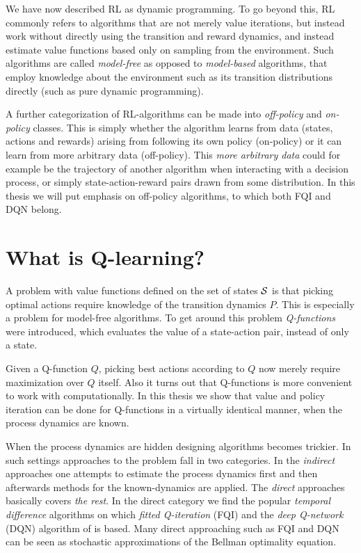 We have now described RL as dynamic programming.
To go beyond this, RL commonly refers to algorithms that
are not merely value iterations, but instead work without
directly using the transition and reward dynamics,
and instead estimate value functions based only on sampling from the
environment.
Such algorithms are called \emph{model-free} as opposed to
\emph{model-based} algorithms, that employ knowledge about the
environment such as its transition distributions directly
(such as pure dynamic programming).

A further categorization of RL-algorithms can be made into
\emph{off-policy} and \emph{on-policy} classes.
This is simply whether the algorithm learns from data
(states, actions and rewards) arising from 
following its own policy (on-policy) or it can learn from more
arbitrary data (off-policy).
This \emph{more arbitrary data} could for example be
the trajectory of another algorithm when interacting with a decision process,
or simply state-action-reward pairs drawn from some distribution.
In this thesis we will put emphasis on off-policy algorithms,
to which both FQI and DQN belong.

\section{What is Q-learning?}

A problem with value functions defined on the set of states $\mathcal{S}$ is that
picking optimal actions require knowledge of the transition dynamics $P$.
This is especially a problem for model-free algorithms.
To get around this problem \emph{Q-functions} were introduced, which evaluates
the value of a state-action pair, instead of only a state.

Given a Q-function $Q$, picking best actions according to $Q$ now
merely require maximization over $Q$ itself.
Also it turns out that Q-functions is
more convenient to work with computationally.
In this thesis we show that value and policy iteration can be done
for Q-functions in a virtually identical manner, when the process dynamics
are known.

When the process dynamics are hidden designing algorithms becomes trickier.
In such settings approaches to the problem
fall in two categories. In the \emph{indirect} approaches
one attempts to estimate the process dynamics first and then afterwards
methods for the known-dynamics are applied.
The \emph{direct} approaches basically covers \emph{the rest}.
In the direct category we find the popular \emph{temporal difference}
algorithms on which \emph{fitted Q-iteration} (FQI)
and the \emph{deep Q-network} (DQN) algorithm of  is based.
Many direct approaching such as FQI and DQN can be seen as
stochastic approximations of the Bellman optimality equation.


